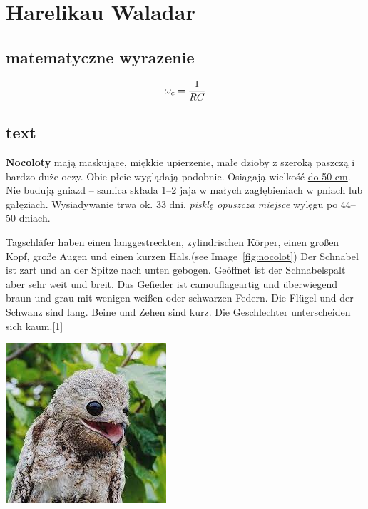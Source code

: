 

\newpage
\section{Harelikau Waladar}
\label{sec:text_vharelikau}

\subsection{matematyczne wyrazenie}
    \begin{equation}
              \omega_c = \frac{1}{RC}\\
    \end{equation}

\subsection{text}
    \begin{flushleft}
         \textbf{Nocoloty} mają maskujące, miękkie upierzenie, małe dzioby z szeroką paszczą i bardzo duże oczy. Obie płcie wyglądają podobnie. Osiągają wielkość \underline{do 50 cm}. Nie budują gniazd – samica składa 1–2 jaja w małych zagłębieniach w pniach lub gałęziach. Wysiadywanie trwa ok. 33 dni, \textit{pisklę opuszcza miejsce} wylęgu po 44–50 dniach. \par Tagschläfer haben einen langgestreckten, zylindrischen Körper, einen großen Kopf, große Augen und einen kurzen Hals.(see Image~\ref{fig:nocolot}) Der Schnabel ist zart und an der Spitze nach unten gebogen. Geöffnet ist der Schnabelspalt aber sehr weit und breit. Das Gefieder ist camouflageartig und überwiegend braun und grau mit wenigen weißen oder schwarzen Federn. Die Flügel und der Schwanz sind lang. Beine und Zehen sind kurz. Die Geschlechter unterscheiden sich kaum.[1]


             \centering
             \includegraphics{pictures/nocolot.jpg}
             \label{fig:nocolot}
         
\end{flushleft}





